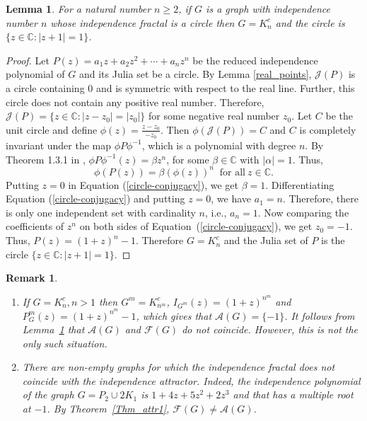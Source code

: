 \documentclass[12pt,a4paper]{article}
\theoremstyle{plain}
\newtheorem{lemma}{Lemma}
\newtheorem{rem}{Remark}[section]
\numberwithin{equation}{section}
\begin{document}
\begin{lemma}
  For a natural number $n \geq 2$, if $G$ is a graph with independence number $n$ whose independence fractal is a circle then $G = K_n ^c$ and the circle is $\{z\in \mathbb{C}: |z+1| = 1\}$.
  \label{circle}
\end{lemma}

\begin{proof}
    Let $P(z)=a_1 z +a_2 z^2+\cdots +a_n z^n$ be the reduced independence polynomial of $G$ and its Julia set be a circle. By Lemma \ref{real_points}, $ \mathcal{J}(P) $ is a circle containing $0$ and is symmetric with respect to the real line. Further, this circle does not contain any positive real number. Therefore, $\mathcal{J}(P)=\{z\in\mathbb{C}:|z - z_0|=|z_0|\}$ for some negative real number $z_0$. Let \(C\) be the unit circle and define \(\phi(z) = \frac{z -z_0}{-z_0}\). Then \(\phi (\mathcal{J}(P))=C\) and \(C\) is completely invariant under the map \(\phi P \phi^{-1}\), which is a polynomial with degree \(n\). By Theorem 1.3.1 in \cite{beardon}, \(\phi P \phi^{-1}(z) =  \beta z^n\), for some \(\beta \in \mathbb{C}\) with \(|\alpha|=1\). Thus, 
\begin{equation}
 \phi (P(z)) = \beta (\phi (z))^n ~\mbox{ for all}~  z \in \mathbb{C} .
 \label{circle-conjugacy}
 \end{equation}
  Putting \(z = 0\) in Equation (\ref{circle-conjugacy}), we get \(\beta = 1\). Differentiating Equation (\ref{circle-conjugacy}) and putting $z=0$, we have $a_1 =n$. Therefore, there is only one independent set with cardinality $n$, i.e., $a_n=1$. Now comparing the coefficients of $z^n$ on both sides of Equation~(\ref{circle-conjugacy}), we get $z_0 =-1$. Thus, $P(z) = (1+z)^n -1$. Therefore $G= K_n ^c$ and the Julia set of $P$ is the circle $\{z\in \mathbb{C}: |z+1| = 1\}$.
\end{proof}

\begin{rem}
	\begin{enumerate}
		\item If $G=K_n ^c, n >1$ then $G^m =K_{n^m}^c$,  $I_{G^m}(z)=(1+z)^{n^m}$ 	and $P_{G}^{m}(z)=(1+z)^{n^m} -1$, which gives that $\mathcal{A}(G)=\{-1\}$. It  follows from  Lemma~\ref{circle} that $\mathcal{A}(G)$ and $\mathcal{F}(G)$ do not coincide. However, this is not the only such situation.  
\item   There are non-empty graphs for which the independence fractal does not coincide with the independence attractor. Indeed, the independence polynomial of the graph $G=P_2 \cup 2 K_1$ is $1+4z +5 z^2 +2z^3$ and that has a multiple root at $-1$. By Theorem~\ref{Thm_attr1}, $\mathcal{F}(G) \neq \mathcal{A}(G)$.
 \end{enumerate}
  	 \label{circle-attractor}
\end{rem} 
\end{document}
